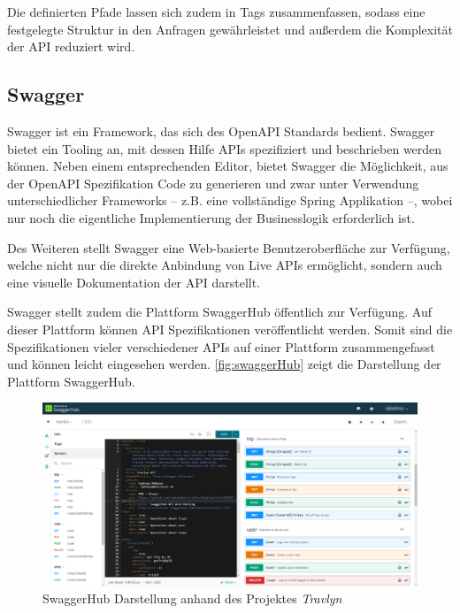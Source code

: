 			Die definierten Pfade lassen sich zudem in Tags zusammenfassen, sodass eine festgelegte Struktur in den Anfragen gewährleistet und außerdem die Komplexität der \acs{API} reduziert wird. 
	
		\subsection{Swagger}\label{sec:swagger} %
		
			Swagger ist ein Framework, das sich des OpenAPI Standards bedient. Swagger bietet ein Tooling an, mit dessen Hilfe \acs{API}s spezifiziert und beschrieben werden können. Neben einem entsprechenden Editor, bietet Swagger die Möglichkeit, aus der OpenAPI Spezifikation Code zu generieren und zwar unter Verwendung unterschiedlicher Frameworks -- z.B. eine vollständige Spring Applikation --, wobei nur noch die eigentliche Implementierung der Businesslogik erforderlich ist.
			
			Des Weiteren stellt Swagger eine Web-basierte Benutzeroberfläche zur Verfügung, welche nicht nur die direkte Anbindung von Live \acs{API}s ermöglicht, sondern auch eine visuelle Dokumentation der \acs{API} darstellt. \cite{SmartBear.2020}
			
			Swagger stellt zudem die Plattform SwaggerHub öffentlich zur Verfügung. Auf dieser Plattform können \acs{API} Spezifikationen veröffentlicht werden. Somit sind die Spezifikationen vieler verschiedener \acs{API}s auf einer Plattform zusammengefasst und können leicht eingesehen werden. \autoref{fig:swaggerHub} zeigt die Darstellung der Plattform SwaggerHub.
			
			\begin{figure}[ht!]
				\centering
				\includegraphics[width=1\textwidth]{images/swagger-hub.png}
				\caption{SwaggerHub Darstellung anhand des Projektes \textit{Travlyn}}
				\label{fig:swaggerHub}
			\end{figure} 
			
